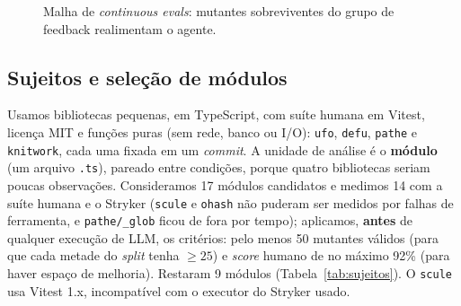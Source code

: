 \documentclass[12pt]{article}
\begin{document}
\begin{figure}[t]
\centering
{}
\caption{Malha de \textit{continuous evals}: mutantes sobreviventes do grupo de feedback realimentam o agente.}
\label{fig:arq}
\end{figure}

\subsection{Sujeitos e seleção de módulos}

Usamos bibliotecas pequenas, em TypeScript, com suíte humana em Vitest, licença MIT e funções puras (sem rede, banco ou
I/O): \texttt{ufo}, \texttt{defu}, \texttt{pathe} e \texttt{knitwork}, cada uma fixada em um \textit{commit}. A unidade de
análise é o \textbf{módulo} (um arquivo \texttt{.ts}), pareado entre condições, porque quatro bibliotecas seriam
poucas observações. Consideramos 17 módulos candidatos e medimos 14 com a suíte humana e o Stryker (\texttt{scule} e \texttt{ohash} não puderam ser medidos por falhas de ferramenta, e \texttt{pathe/\_glob} ficou de fora por tempo); aplicamos, \textbf{antes} de qualquer
execução de LLM, os critérios: pelo menos 50 mutantes válidos (para que cada metade do \textit{split} tenha $\geq 25$) e
\textit{score} humano de no máximo 92\% (para haver espaço de melhoria). Restaram 9 módulos (Tabela~\ref{tab:sujeitos}).
O \texttt{scule} usa Vitest 1.x, incompatível com o executor do Stryker usado.
\end{document}
